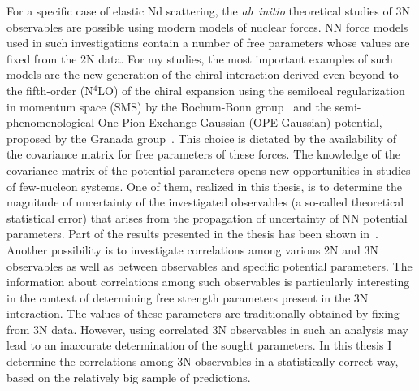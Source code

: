 For a specific case of elastic Nd scattering, the \textit{ab~initio} theoretical studies of 3N observables are possible 
using modern models of nuclear forces. NN force models used in such investigations contain a number 
of free parameters whose values are fixed from the 2N data. 
For my studies, the most important examples of such models are the new generation of the chiral 
interaction derived even beyond to the fifth-order (N$^{4}$LO) of the chiral expansion using the semilocal regularization 
in momentum space (SMS) by the Bochum-Bonn group~\cite{Reinert2018} and the semi-phenomenological 
One-Pion-Exchange-Gaussian (OPE-Gaussian) potential, proposed by the Granada group~\cite{NavarroPerez2014}. 
This choice is dictated by the availability of the covariance matrix for free parameters of these forces. 
The knowledge of the covariance matrix of the potential parameters opens new opportunities in studies of 
few-nucleon systems. 
One of them, realized in this thesis, is to determine the magnitude of uncertainty of the investigated observables (a so-called theoretical statistical error)
that arises from the propagation of uncertainty of NN potential parameters. Part of the results presented in the thesis has been shown 
in~\cite{Skibinski2018, volkotrub2020uncertainty}.
Another possibility is to investigate correlations among various 2N and 3N observables 
as well as between observables and specific potential parameters. The information 
about correlations among such observables is particularly interesting in the 
context of determining free strength parameters present in the 3N 
interaction. The values of these parameters are traditionally obtained by 
fixing from 3N data. However, using correlated 3N 
observables in such an analysis may lead to an inaccurate determination of the sought parameters. 
In this thesis I determine the correlations among 
3N observables in a statistically correct way, based on the relatively big 
sample of predictions. 

